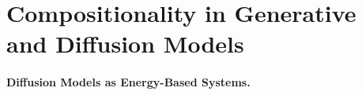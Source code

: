 \section{Compositionality in Generative and Diffusion Models}
\label{sec:compositionality_models}

\paragraph{Diffusion Models as Energy-Based Systems.}

